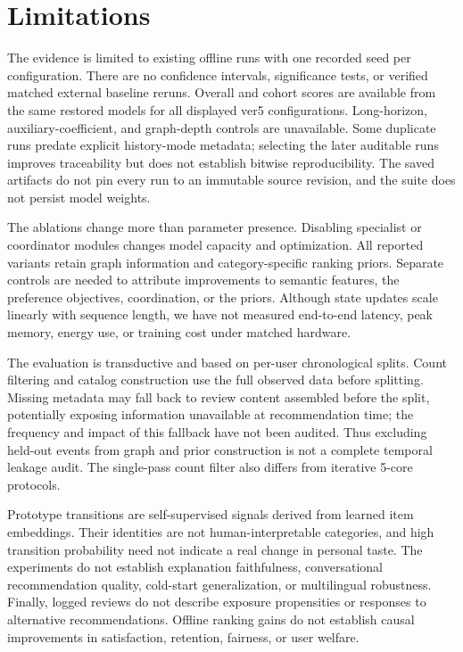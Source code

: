 \documentclass[11pt]{article}
\begin{document}
\section*{Limitations}
The evidence is limited to existing offline runs with one recorded seed per configuration. There are no confidence intervals, significance tests, or verified matched external baseline reruns. Overall and cohort scores are available from the same restored models for all displayed ver5 configurations. Long-horizon, auxiliary-coefficient, and graph-depth controls are unavailable. Some duplicate runs predate explicit history-mode metadata; selecting the later auditable runs improves traceability but does not establish bitwise reproducibility. The saved artifacts do not pin every run to an immutable source revision, and the suite does not persist model weights.

The ablations change more than parameter presence. Disabling specialist or coordinator modules changes model capacity and optimization. All reported variants retain graph information and category-specific ranking priors. Separate controls are needed to attribute improvements to semantic features, the preference objectives, coordination, or the priors. Although state updates scale linearly with sequence length, we have not measured end-to-end latency, peak memory, energy use, or training cost under matched hardware.

The evaluation is transductive and based on per-user chronological splits. Count filtering and catalog construction use the full observed data before splitting. Missing metadata may fall back to review content assembled before the split, potentially exposing information unavailable at recommendation time; the frequency and impact of this fallback have not been audited. Thus excluding held-out events from graph and prior construction is not a complete temporal leakage audit. The single-pass count filter also differs from iterative 5-core protocols.

Prototype transitions are self-supervised signals derived from learned item embeddings. Their identities are not human-interpretable categories, and high transition probability need not indicate a real change in personal taste. The experiments do not establish explanation faithfulness, conversational recommendation quality, cold-start generalization, or multilingual robustness. Finally, logged reviews do not describe exposure propensities or responses to alternative recommendations. Offline ranking gains do not establish causal improvements in satisfaction, retention, fairness, or user welfare.
\end{document}
